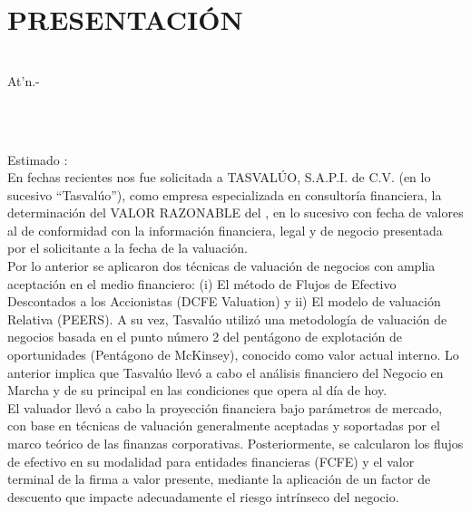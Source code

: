 \section*{PRESENTACIÓN}

\textcolor{principal}{\empresaSolicitante}\\ 

\textcolor{principal}{At'n.- \personaSolicitante}\\ 
\textcolor{principal}{\caracterSolicitante}\\

\begin{minipage}{.4\textwidth}
\ubicacionBien\\[10pt]
\end{minipage}


Estimado \textcolor{principal}{\personaSolicitante}:\\[10pt]

En fechas recientes nos fue solicitada a \textcolor{principal}{TASVALÚO, S.A.P.I. de C.V.} (en lo sucesivo ``\textcolor{principal}{Tasvalúo}''), como empresa especializada en consultoría financiera, la determinación del \textcolor{principal}{VALOR RAZONABLE} del \descripcionBien, en lo sucesivo \textcolor{principal}{\empresaCorto} con fecha de valores al \textcolor{principal}{\fechaValores} de conformidad con la información financiera, legal y de negocio presentada por el solicitante a la fecha de la valuación.\\



Por lo anterior se aplicaron dos técnicas de valuación de negocios con amplia aceptación en el medio financiero: \textcolor{principal}{(i) El método de Flujos de Efectivo Descontados a los Accionistas (DCFE Valuation}) y \textcolor{principal}{ii) El modelo de valuación Relativa (PEERS)}. A su vez, \textcolor{principal}{Tasvalúo} utilizó una metodología de valuación de negocios basada en el punto número 2 del pentágono de explotación de oportunidades (Pentágono de McKinsey), conocido como valor actual interno. Lo anterior  implica que \textcolor{principal}{Tasvalúo} llevó a  cabo el análisis financiero del Negocio en Marcha y de su principal \tipoAvaluo{} en las condiciones que opera al día de hoy.\\


El valuador llevó a cabo la \textcolor{principal}{proyección financiera} bajo parámetros de mercado, con base en técnicas de valuación generalmente aceptadas y soportadas por el marco teórico de las finanzas corporativas. Posteriormente, se calcularon los flujos de efectivo en su modalidad para entidades financieras (FCFE) y el valor terminal de la firma a valor presente, mediante la aplicación de un factor de descuento  que impacte adecuadamente el riesgo intrínseco del negocio.\\

